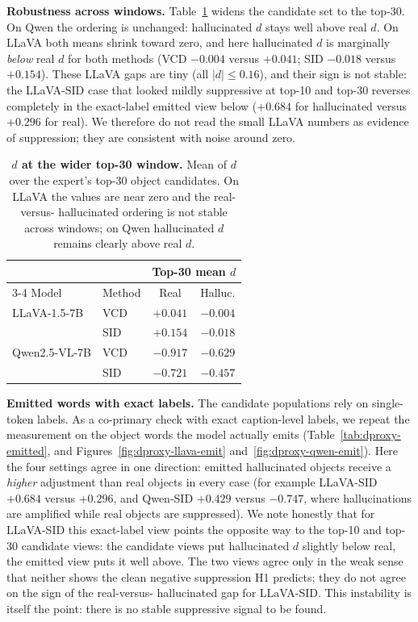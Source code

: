 \textbf{Robustness across windows.} Table~\ref{tab:dproxy-robust} widens the
candidate set to the top-30. On Qwen the ordering is unchanged: hallucinated $d$
stays well above real $d$. On LLaVA both means shrink toward zero, and here
hallucinated $d$ is marginally \emph{below} real $d$ for both methods (VCD
$-0.004$ versus $+0.041$; SID $-0.018$ versus $+0.154$). These LLaVA gaps are
tiny (all $|d| \le 0.16$), and their sign is not stable: the LLaVA-SID case that
looked mildly suppressive at top-10 and top-30 reverses completely in the
exact-label emitted view below ($+0.684$ for hallucinated versus $+0.296$ for
real). We therefore do not read the small LLaVA numbers as evidence of
suppression; they are consistent with noise around zero.

\begin{table}[t]
\centering
\small
\setlength{\tabcolsep}{5pt}
\caption{\textbf{$d$ at the wider top-30 window.} Mean of $d$ over the expert's
top-30 object candidates. On LLaVA the values are near zero and the real-versus-
hallucinated ordering is not stable across windows; on Qwen hallucinated $d$
remains clearly above real $d$.}
\label{tab:dproxy-robust}
\begin{tabular}{ll cc}
\toprule
& & \multicolumn{2}{c}{Top-30 mean $d$} \\
\cmidrule(lr){3-4}
Model & Method & Real & Halluc. \\
\midrule
LLaVA-1.5-7B & VCD & $+0.041$ & $-0.004$ \\
 & SID & $+0.154$ & $-0.018$ \\
Qwen2.5-VL-7B & VCD & $-0.917$ & $-0.629$ \\
 & SID & $-0.721$ & $-0.457$ \\
\bottomrule
\end{tabular}
\end{table}

\textbf{Emitted words with exact labels.} The candidate populations rely on
single-token labels. As a co-primary check with exact caption-level labels, we
repeat the measurement on the object words the model actually emits
(Table~\ref{tab:dproxy-emitted}, and Figures~\ref{fig:dproxy-llava-emit}
and~\ref{fig:dproxy-qwen-emit}). Here the four settings agree in one direction:
emitted hallucinated objects receive a \emph{higher} adjustment than real objects
in every case (for example LLaVA-SID $+0.684$ versus $+0.296$, and Qwen-SID
$+0.429$ versus $-0.747$, where hallucinations are amplified while real objects
are suppressed). We note honestly that for LLaVA-SID this exact-label view points
the opposite way to the top-10 and top-30 candidate views: the candidate views
put hallucinated $d$ slightly below real, the emitted view puts it well above.
The two views agree only in the weak sense that neither shows the clean negative
suppression H1 predicts; they do not agree on the sign of the real-versus-
hallucinated gap for LLaVA-SID. This instability is itself the point: there is no
stable suppressive signal to be found.

